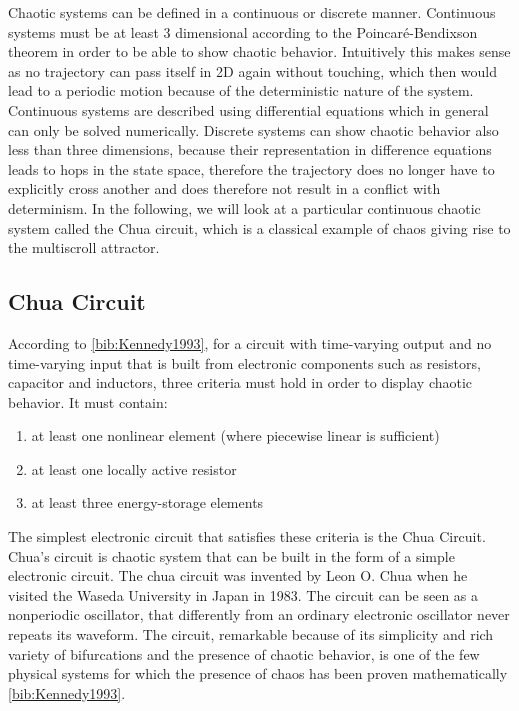 \documentclass[main]{subfiles}
\begin{document}
Chaotic systems can be defined in a continuous or discrete manner. Continuous systems must be at least 3 dimensional according to the Poincaré-Bendixson theorem in order to be able to show chaotic behavior. Intuitively this makes sense as no trajectory can pass itself in 2D again without touching, which then would lead to a periodic motion because of the deterministic nature of the system. Continuous systems are described using differential equations which in general can only be solved numerically. Discrete systems can show chaotic behavior also less than three dimensions, because their representation in difference equations leads to hops in the state space, therefore the trajectory does no longer have to explicitly cross another and does therefore not result in a conflict with determinism. In the following, we will look at a particular continuous chaotic system called the Chua circuit, which is a classical example of chaos giving rise to the multiscroll attractor.

\subsection{Chua Circuit}
\label{subsec:chua-circuit}

According to \ref{bib:Kennedy1993}, for a circuit with time-varying output and no time-varying input that is built from electronic components such as resistors, capacitor and inductors, three criteria must hold in order to display chaotic behavior. It must contain:
\begin{enumerate}
  \item at least one nonlinear element (where piecewise linear is sufficient)
  \item at least one locally active resistor
  \item at least three energy-storage elements
\end{enumerate}
  
The simplest electronic circuit that satisfies these criteria is the Chua Circuit. Chua's circuit is chaotic system that can be built in the form of a simple electronic circuit. The chua circuit was invented by Leon O. Chua when he visited the Waseda University in Japan in 1983. The circuit can be seen as a nonperiodic oscillator, that differently from an ordinary electronic oscillator never repeats its waveform. The circuit, remarkable because of its simplicity and rich variety of bifurcations and the presence of chaotic behavior, is one of the few physical systems for which the presence of chaos has been proven mathematically \ref{bib:Kennedy1993}.
\end{document}
